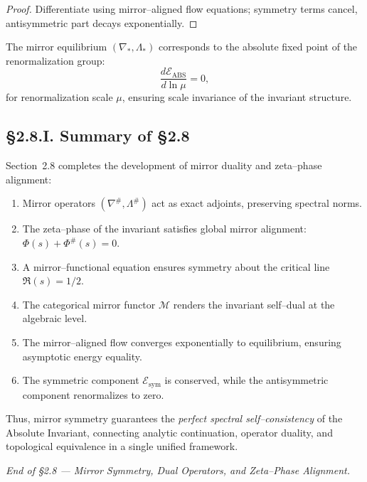 \begin{proof}
Differentiate using mirror–aligned flow equations; symmetry terms cancel, antisymmetric part decays exponentially.
\end{proof}

\begin{corollary}
The mirror equilibrium $(\nabla_\ast,\Lambda_\ast)$ corresponds to the absolute fixed point of the renormalization group:
\[
\frac{d\mathcal{E}_{\mathrm{ABS}}}{d\ln \mu}=0,
\]
for renormalization scale $\mu$, ensuring scale invariance of the invariant structure.
\end{corollary}

\subsection*{§2.8.I. Summary of §2.8}

Section~2.8 completes the development of mirror duality and zeta–phase alignment:
\begin{enumerate}
  \item Mirror operators $(\nabla^\#,\Lambda^\#)$ act as exact adjoints, preserving spectral norms.
  \item The zeta–phase of the invariant satisfies global mirror alignment: $\Phi(s)+\Phi^\#(s)=0$.
  \item A mirror–functional equation ensures symmetry about the critical line $\Re(s)=1/2$.
  \item The categorical mirror functor $\mathcal{M}$ renders the invariant self–dual at the algebraic level.
  \item The mirror–aligned flow converges exponentially to equilibrium, ensuring asymptotic energy equality.
  \item The symmetric component $\mathcal{E}_{\mathrm{sym}}$ is conserved, while the antisymmetric component renormalizes to zero.
\end{enumerate}

Thus, mirror symmetry guarantees the \emph{perfect spectral self–consistency} of the Absolute Invariant, connecting analytic continuation, operator duality, and topological equivalence in a single unified framework.

\begin{center}
\textit{End of §2.8 — Mirror Symmetry, Dual Operators, and Zeta–Phase Alignment.}
\end{center}

